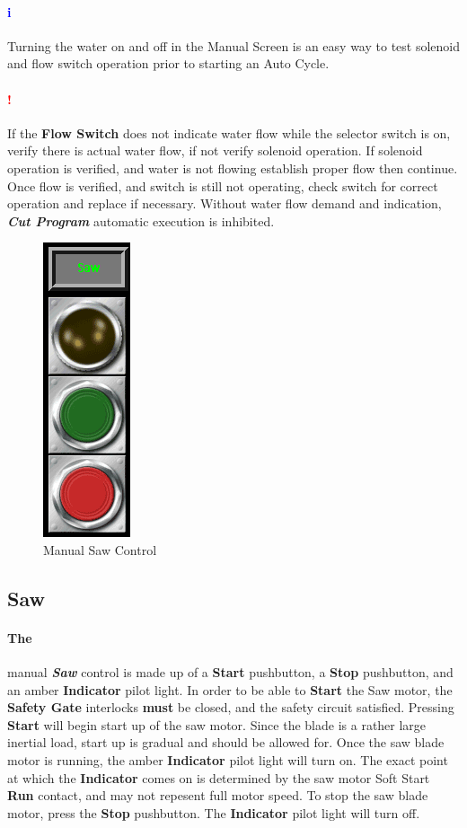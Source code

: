 \paragraph{\textbf{\LARGE \textcolor{blue}{i}}}Turning the water on and off in the Manual Screen is an easy way to test solenoid and flow switch operation prior to starting an Auto Cycle.
\paragraph{\textbf{{\LARGE \textcolor{red}{!}}}}If the \textbf{Flow Switch} does not indicate water flow while the selector switch is on, verify there is actual water flow, if not verify solenoid operation. If solenoid operation is verified, and water is not flowing establish proper flow then continue. Once flow is verified, and switch is still not operating, check switch for correct operation and replace if necessary. Without water flow demand and indication, \textbf{\textit{Cut Program}} automatic execution is inhibited.
\pagebreak
\begin{figure}
	\centering
	\includegraphics[width=.2\linewidth]{screen-captures/manual/manual-saw}
	\caption{Manual Saw Control}
	\label{fig:manual-saw}
\end{figure}
\subsection{Saw}\paragraph*{The}manual \textbf{\textit{Saw}} control is made up of a \textbf{Start} pushbutton, a \textbf{Stop} pushbutton, and an amber \textbf{Indicator} pilot light. In order to be able to \textbf{Start} the Saw motor, the \textbf{Safety Gate} interlocks \textbf{must} be closed, and the safety circuit satisfied. Pressing \textbf{Start} will begin start up of the saw motor. Since the blade is a rather large inertial load, start up is gradual and should be allowed for. Once the saw blade motor is running, the amber \textbf{Indicator} pilot light will turn on. The exact point at which the \textbf{Indicator} comes on is determined by the saw motor Soft Start \textbf{Run} contact, and may not repesent full motor speed. To stop the saw blade motor, press the \textbf{Stop} pushbutton. The \textbf{Indicator} pilot light will turn off.

